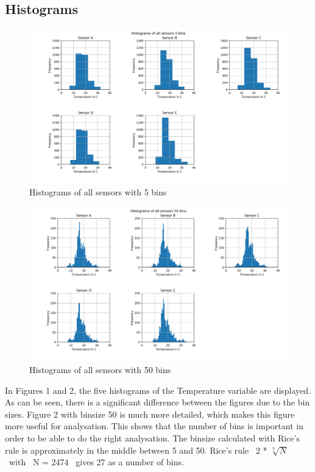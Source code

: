 \documentclass{article}
\begin{document}
    \subsection{Histograms}
        \begin{figure}[H]
            \includegraphics[width=\textwidth]{histogram_5_bins}
            \caption{Histograms of all sensors with 5 bins}
        \end{figure}

        \begin{figure}[H]
            \includegraphics[width=\textwidth]{histogram_50_bins}
            \caption{Histograms of all sensors with 50 bins}
        \end{figure}
        
        In Figures 1 and 2, the five histograms of the Temperature variable are displayed.
        As can be seen, there is a significant difference between the figures due to the bin sizes.
        Figure 2 with binsize 50 is much more detailed, which makes this figure more useful for analysation.
        This shows that the number of bins is important in order to be able to do the right analysation.
        The binsize calculated with Rice's rule is approximately in the middle between 5 and 50. 
        Rice's rule \ 2 * $\sqrt[3]{N}$ \ with \ N = 2474 \ gives 27 as a number of bins. 
\end{document}
